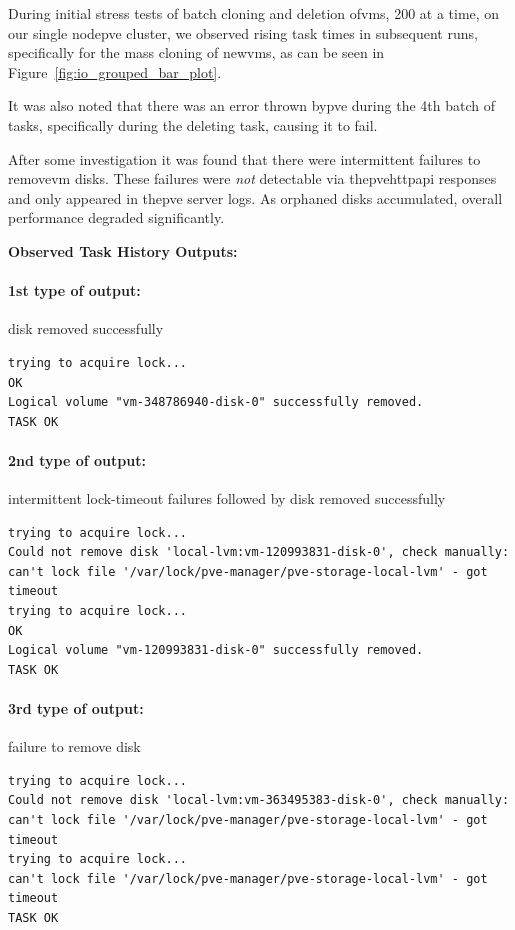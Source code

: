        During initial stress tests of batch cloning and deletion of\ac{vm}s, 200 at a time, on our single node\ac{pve} cluster, 
        we observed rising task times in subsequent runs, specifically for the mass cloning of new\ac{vm}s, as can be seen in 
        Figure~\ref{fig:io_grouped_bar_plot}.

        It was also noted that there was an error thrown by\ac{pve} during the 4th batch of tasks, specifically during the 
        deleting task, causing it to fail.

        After some investigation it was found that there were intermittent failures to remove\ac{vm} disks. These failures 
        were \emph{not} detectable via the\ac{pve}\ac{http}\ac{api} responses and only appeared in the\ac{pve} server 
        logs. As orphaned disks accumulated, overall performance degraded significantly.
        \medskip

        \noindent\textbf{Observed Task History Outputs:}

\paragraph{1st type of output:} disk removed successfully

        \begin{verbatim}
trying to acquire lock...
OK
Logical volume "vm-348786940-disk-0" successfully removed.
TASK OK
        \end{verbatim}

\paragraph{2nd type of output:} intermittent lock-timeout failures followed by disk removed successfully

        \begin{verbatim}
trying to acquire lock...
Could not remove disk 'local-lvm:vm-120993831-disk-0', check manually:
can't lock file '/var/lock/pve-manager/pve-storage-local-lvm' - got timeout
trying to acquire lock...
OK
Logical volume "vm-120993831-disk-0" successfully removed.
TASK OK
        \end{verbatim}
        
\paragraph{ 3rd type of output:} failure to remove disk

        \begin{verbatim}
trying to acquire lock...
Could not remove disk 'local-lvm:vm-363495383-disk-0', check manually:
can't lock file '/var/lock/pve-manager/pve-storage-local-lvm' - got timeout
trying to acquire lock...
can't lock file '/var/lock/pve-manager/pve-storage-local-lvm' - got timeout
TASK OK
        \end{verbatim}

